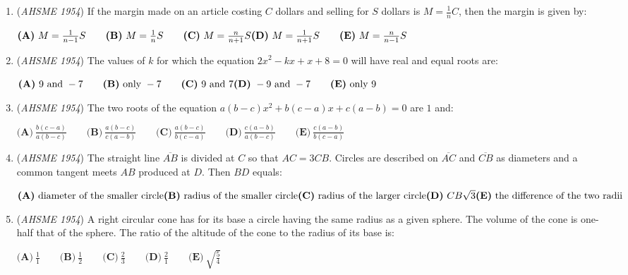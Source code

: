 \begin{enumerate}
	\item (\textit{AHSME 1954}) If the margin made on an article costing $C$ dollars and selling for $S$ dollars is $M=\frac{1}{n}C$, then the margin is given by: 


 $\textbf{(A)}\ M=\frac{1}{n-1}S\qquad\textbf{(B)}\ M=\frac{1}{n}S\qquad\textbf{(C)}\ M=\frac{n}{n+1}S\\ \textbf{(D)}\ M=\frac{1}{n+1}S\qquad\textbf{(E)}\ M=\frac{n}{n-1}S$


	\item (\textit{AHSME 1954}) The values of $k$ for which the equation $2x^2-kx+x+8=0$ will have real and equal roots are: 


 $\textbf{(A)}\ 9\text{ and }-7\qquad\textbf{(B)}\ \text{only }-7\qquad\textbf{(C)}\ \text{9 and 7}\\ \textbf{(D)}\ -9\text{ and }-7\qquad\textbf{(E)}\ \text{only 9}$


	\item (\textit{AHSME 1954}) The two roots of the equation $a(b-c)x^2+b(c-a)x+c(a-b)=0$ are $1$ and: 


 $\textbf{(A)}\ \frac{b(c-a)}{a(b-c)}\qquad\textbf{(B)}\ \frac{a(b-c)}{c(a-b)}\qquad\textbf{(C)}\ \frac{a(b-c)}{b(c-a)}\qquad\textbf{(D)}\ \frac{c(a-b)}{a(b-c)}\qquad\textbf{(E)}\ \frac{c(a-b)}{b(c-a)}$


	\item (\textit{AHSME 1954}) The straight line $\overline{AB}$ is divided at $C$ so that $AC=3CB$. Circles are described on $\overline{AC}$ 
and $\overline{CB}$ as diameters and a common tangent meets $AB$ produced at $D$. Then $BD$ equals: 


 $\textbf{(A)}\ \text{diameter of the smaller circle}\\ \textbf{(B)}\ \text{radius of the smaller circle}\\ \textbf{(C)}\ \text{radius of the larger circle}\\ \textbf{(D)}\ CB\sqrt{3}\\ \textbf{(E)}\ \text{the difference of the two radii}$


	\item (\textit{AHSME 1954}) A right circular cone has for its base a circle having the same radius as a given sphere. 
The volume of the cone is one-half that of the sphere. The ratio of the altitude of the cone to the radius of its base is:


 $\textbf{(A)}\ \frac{1}{1}\qquad\textbf{(B)}\ \frac{1}{2}\qquad\textbf{(C)}\ \frac{2}{3}\qquad\textbf{(D)}\ \frac{2}{1}\qquad\textbf{(E)}\ \sqrt{\frac{5}{4}}$



\end{enumerate}
